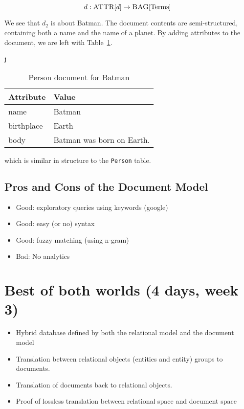 		$$d:\textsc{ATTR}\lbrack d\rbrack \to \textsc{BAG}\lbrack \mathrm{Terms}\rbrack$$
		
		\begin{ex}
			We see that $d_2$ is about Batman.  The document contents are semi-structured, containing both a name and the name of a planet.  By adding attributes to the document, we are left with Table~\ref{tbl:person-document}.
			
			\begin{table}[!ht]j
				\centering
				
				\begin{tabular}{ll}
					\toprule
					Attribute & Value \\
					\midrule
					name & Batman \\
					birthplace & Earth \\
					body & Batman was born on Earth. \\
					\bottomrule
				\end{tabular}
				
				\caption{Person document for Batman}
				\label{tbl:person-document}
			\end{table}
			
			which is similar in structure to the \texttt{Person} table.
		\end{ex}


	\subsection{Pros and Cons of the Document Model}
	\begin{itemize}
		\item Good: exploratory queries using keywords (google)
		\item Good: easy (or no) syntax
		\item Good: fuzzy matching (using n-gram)
		\item Bad: No analytics
	\end{itemize}
		
\section{Best of both worlds (4 days, week 3)}
	\begin{itemize}
		\item Hybrid database defined by both the relational model and the document model
		\item Translation between relational objects (entities and entity) groups to documents.
		\item Translation of documents back to relational objects.
		\item Proof of lossless translation between relational space and document space
	\end{itemize}